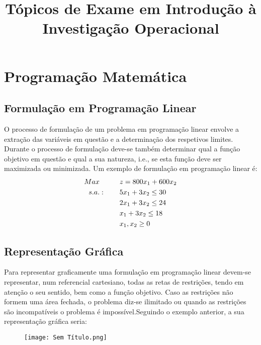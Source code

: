 \documentclass[10pt,a4paper]{report}
\title{\Huge{Tópicos de Exame em Introdução à Investigação Operacional}}
\date{}
\begin{document}
\maketitle
\chapter{Programação Matemática}
\section{Formulação em Programação Linear}
O processo de formulação de um problema em programação linear envolve a extração das variáveis em questão e a determinação dos respetivos limites. Durante o processo de formulação deve-se também determinar qual a função objetivo em questão e qual a sua natureza, i.e., se esta função deve ser maximizada ou minimizada. Um exemplo de formulação em programação linear é:
\begin{align}
Max \hspace{1cm} &z = 800x_1 + 600x_2\\
s.a.: \hspace{0.8cm} &5x_1 + 3x_2 \leq 30\\
&2x_1 + 3x_2 \leq 24\\
&x_1 + 3x_2 \leq 18\\
&x_1, x_2 \geq 0
\end{align}
\section{Representação Gráfica}
Para representar graficamente uma formulação em programação linear devem-se representar, num referencial cartesiano, todas as retas de restrições, tendo em atenção o seu sentido, bem como a função objetivo. Caso as restrições não formem uma área fechada, o problema diz-se ilimitado ou quando as restrições são incompatíveis o problema é impossível.Seguindo o exemplo anterior, a sua representação gráfica seria:
\begin{figure}[H]
\centering
\texttt{[image: Sem Título.png]}
\end{figure}
\end{document}
